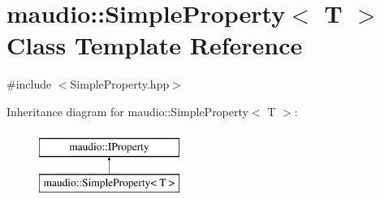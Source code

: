 \hypertarget{classmaudio_1_1SimpleProperty}{\section{maudio\-:\-:Simple\-Property$<$ T $>$ Class Template Reference}
\label{classmaudio_1_1SimpleProperty}
}


{\ttfamily \#include $<$Simple\-Property.\-hpp$>$}

Inheritance diagram for maudio\-:\-:Simple\-Property$<$ T $>$\-:\begin{figure}[H]
\begin{center}
\leavevmode
\includegraphics[height=2.000000cm]{classmaudio_1_1SimpleProperty}
\end{center}
\end{figure}
